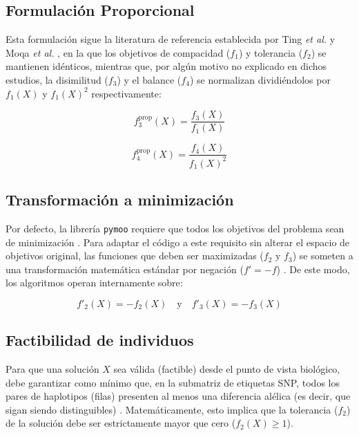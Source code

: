 \subsection{Formulación Proporcional}
Esta formulación sigue la literatura de referencia establecida por Ting \textit{et al.} \cite{ting2010multi} y Moqa \textit{et al.} \cite{moqa2022assessing}, en la que los objetivos de compacidad ($f_1$) y tolerancia ($f_2$) se mantienen idénticos, mientras que, por algún motivo no explicado en dichos estudios, la disimilitud ($f_3$) y el balance ($f_4$) se normalizan dividiéndolos por $f_1(X)$ y $f_1(X)^2$ respectivamente:

\begin{equation}
    f_3^{\text{prop}}(X) = \frac{f_3(X)}{f_1(X)}
\end{equation}

\begin{equation}
    f_4^{\text{prop}}(X) = \frac{f_4(X)}{f_1(X)^2}
\end{equation}

\subsection{Transformación a minimización}
Por defecto, la librería \texttt{pymoo} requiere que todos los objetivos del problema sean de minimización \cite{pymoo}. Para adaptar el código a este requisito sin alterar el espacio de objetivos original, las funciones que deben ser maximizadas ($f_2$ y $f_3$) se someten a una transformación matemática estándar por negación ($f' = -f$) \cite{deb2001multiobjective}. De este modo, los algoritmos operan internamente sobre:

\begin{equation}
    f'_2(X) = -f_2(X) \quad \text{y} \quad f'_3(X) = -f_3(X)
\end{equation}

\subsection{Factibilidad de individuos}
Para que una solución $X$ sea válida (factible) desde el punto de vista biológico, debe garantizar como mínimo que, en la submatriz de etiquetas SNP, todos los pares de haplotipos (filas) presenten al menos una diferencia alélica (es decir, que sigan siendo distinguibles) \cite{bafna2003haplotypes}. Matemáticamente, esto implica que la tolerancia ($f_2$) de la solución debe ser estrictamente mayor que cero ($f_2(X) \ge 1$).

